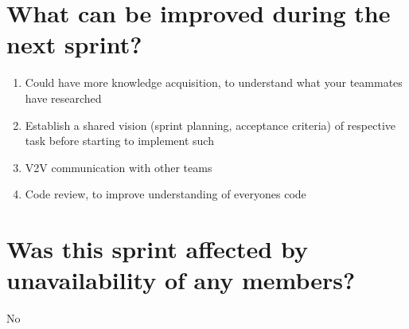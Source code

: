 \documentclass[11pt]{article}
\begin{document}
\section*{What can be improved during the next sprint?}
\begin{enumerate}
	\item Could have more knowledge acquisition, to  understand what your teammates have researched
	\item Establish a shared vision (sprint planning, acceptance criteria) of respective task before starting to implement such
	\item V2V communication with other teams
	\item Code review, to improve understanding of everyones code
\end{enumerate} 


\section*{Was this sprint affected by unavailability of any members?}
No
\end{document}
